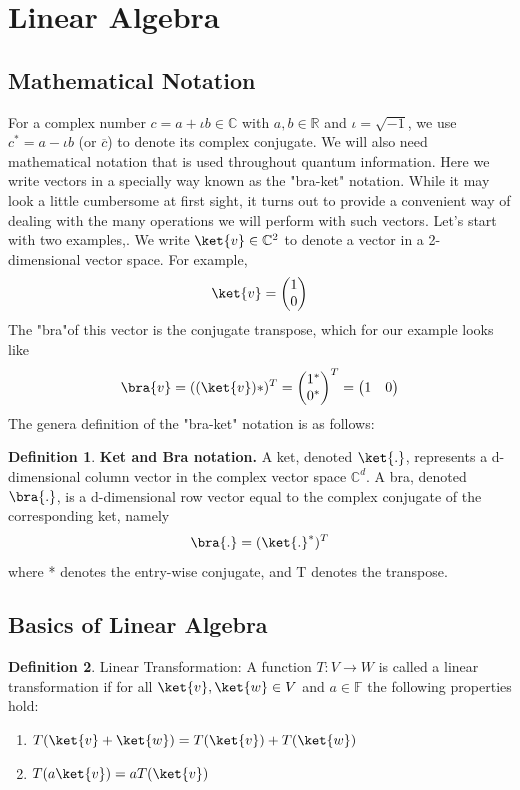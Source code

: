 \documentclass[12pt, oneside]{book}
\theoremstyle{definition}
\newtheorem{definition}{Definition}[section]
\theoremstyle{definition}
\theoremstyle{remark}
\begin{document}
\section{Linear Algebra}
\subsection{Mathematical Notation}
For a complex number $c=a+\iota b \in \mathbb{C}$ with $a,b\in \mathbb{R}$ and $\iota =\sqrt{-1}$, we use $c^*=a-\iota b$ (or $\overline{c}$) to denote its complex conjugate. We will also need mathematical notation that is used throughout quantum information. Here we write vectors in a specially way known as the "bra-ket" notation. While it may look a little cumbersome at first sight, it turns out to provide a convenient way of dealing with the many operations we will perform with such vectors. Let's start with two examples,. We write $\ket{v} \in \mathbb{C}^2$ to denote a vector in a 2-dimensional vector space. For example,
\[
\ket{v}=\begin{pmatrix} 1 \\ 0 \end{pmatrix}
\]
The "bra"of this vector is the conjugate transpose, which for our example looks like
\[
\bra{v} = ((\ket{v})*)^T=\begin{pmatrix} 1^* \\ 0^* \end{pmatrix}^T=\begin{pmatrix} 1 & 0 \end{pmatrix}
\]
The genera definition of the "bra-ket" notation is as follows:
\begin{definition}
    \textbf{Ket and Bra notation.} A ket, denoted $\ket{.}$, represents a d-dimensional column vector in the complex vector space $\mathbb{C}^d$. A bra, denoted $\bra{.}$, is a d-dimensional row vector equal to the complex conjugate of the corresponding ket, namely
    \[
    \bra{.}=(\ket{.}^*)^T
    \]
    where * denotes the entry-wise conjugate, and T denotes the transpose.
\end{definition}


\subsection{Basics of Linear Algebra}

\begin{definition}
    Linear Transformation: A function $T:V\rightarrow W$ is called a linear transformation if for all $\ket{v},\ket{w}\in V$ and $a\in\mathbb{F}$ the following properties hold:
    \begin{enumerate}
        \item $T(\ket{v}+\ket{w})=T(\ket{v})+T(\ket{w})$
        \item $T(a\ket{v})=aT(\ket{v})$
    \end{enumerate}
\end{definition}
\end{document}
